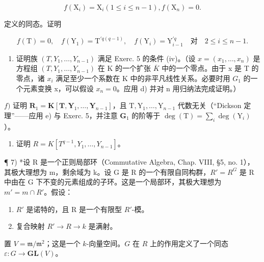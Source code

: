 \[
f \left(\mathrm{X} _ {i}\right) = \mathrm{X} _ {i} (1 \leqslant i \leqslant n - 1), f \left(\mathrm{X} _ {n}\right) = 0.
\]

定义的同态。证明

\[
f (\mathrm{T}) = 0, \quad f (\mathrm{Y} _ {1}) = \mathrm{T} ^ {\prime q (q - 1)}, \quad f (\mathrm{Y} _ {i}) = \mathrm{Y} _ {i - 1} ^ {\prime q} \quad \text{对} \quad 2 \leqslant i \leqslant n - 1.
\]

\begin{enumerate}
\def\labelenumi{\alph{enumi})}
\setcounter{enumi}{4}
\tightlist
\item
  证明族 \((T, Y_{1}, \ldots, Y_{n-1})\) 满足 Exerc. 5 的条件 (iv)。（设 \(x = (x_{1}, \ldots, x_{n})\) 是方程组 \((T, Y_{1}, \ldots, Y_{n-1})\) 在 K 的一个扩张 \(\overline{K}\) 中的一个零点。由于 x 是 T 的零点，诸 \(x_{i}\) 满足至少一个系数在 K 中的非平凡线性关系。必要时用 \(G_{1}\) 的一个元素变换 x，可以假设 \(x_{n} = 0\)。应用 d) 并对 n 用归纳法完成证明。）
\end{enumerate}

\(f)\) 证明 \(\mathbf{R}_1 = \mathbf{K}[\mathbf{T},\mathbf{Y}_1,\dots ,\mathbf{Y}_{n - 1}]\)，且 \(\mathrm{T},\mathrm{Y}_1,\dots ,\mathrm{Y}_{n - 1}\) 代数无关（“Dickson 定理”——应用 e) 与 Exerc. 5，并注意 \(\mathbf{G}_1\) 的阶等于 \(\deg (\mathrm{T}) = \sum_{i}\deg (\mathrm{Y}_i)\)）。

\begin{enumerate}
\def\labelenumi{\alph{enumi})}
\setcounter{enumi}{6}
\tightlist
\item
  证明 \(R = K[T^{q-1}, Y_{1}, \ldots, Y_{n-1}]\)。
\end{enumerate}

¶ 7) *设 R 是一个正则局部环（Commutative Algebra, Chap. VIII, §5, no. 1），其极大理想为 m，剩余域为 k。设 G 是 R 的一个有限自同构群，\(R' = R^{G}\) 是 R 中由在 G 下不变的元素组成的子环。这是一个局部环，其极大理想为 \(m' = m \cap R'\)。假设：

\begin{enumerate}
\def\labelenumi{(\roman{enumi})}
\item
  \(R'\) 是诺特的，且 R 是一个有限型 \(R'\)-模。
\item
  复合映射 \(R'\to R\to k\) 是满射。
\end{enumerate}

置 \(V = \mathfrak{m} / \mathfrak{m}^2\)；这是一个 \(k\)-向量空间。\(G\) 在 \(R\) 上的作用定义了一个同态 \(\varepsilon : G \to \mathbf{GL}(V)\)。

